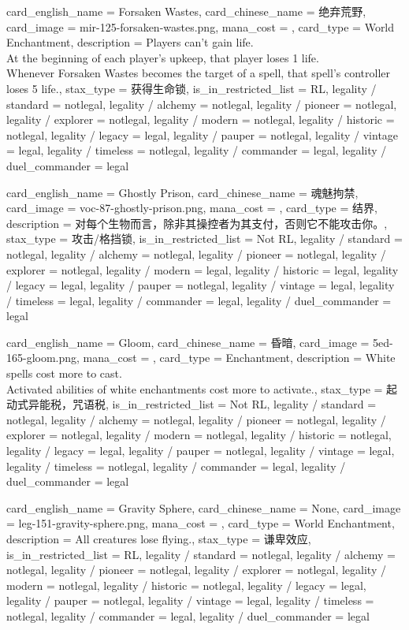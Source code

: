 \documentclass[lang = cn, color = black, 10pt]{AllThatStax}
\begin{document}
\card
{
	card_english_name = {Forsaken Wastes},
	card_chinese_name = {绝弃荒野},
	card_image = mir-125-forsaken-wastes.png,
	mana_cost = ,
	card_type = World Enchantment,
	description = {Players can't gain life.\\
		At the beginning of each player's upkeep, that player loses 1 life.\\
		Whenever Forsaken Wastes becomes the target of a spell, that spell's controller loses 5 life.},
	stax_type = 获得生命锁,
	is_in_restricted_list = RL,
	legality / standard = notlegal,
	legality / alchemy = notlegal,
	legality / pioneer = notlegal,
	legality / explorer = notlegal,
	legality / modern = notlegal,
	legality / historic = notlegal,
	legality / legacy = legal,
	legality / pauper = notlegal,
	legality / vintage = legal,
	legality / timeless = notlegal,
	legality / commander = legal,
	legality / duel_commander = legal
}

\card
{
	card_english_name = {Ghostly Prison},
	card_chinese_name = {魂魅拘禁},
	card_image = voc-87-ghostly-prison.png,
	mana_cost = ,
	card_type = 结界,
	description = {对每个生物而言，除非其操控者为其支付，否则它不能攻击你。},
	stax_type = 攻击/格挡锁,
	is_in_restricted_list = Not RL,
	legality / standard = notlegal,
	legality / alchemy = notlegal,
	legality / pioneer = notlegal,
	legality / explorer = notlegal,
	legality / modern = legal,
	legality / historic = legal,
	legality / legacy = legal,
	legality / pauper = notlegal,
	legality / vintage = legal,
	legality / timeless = legal,
	legality / commander = legal,
	legality / duel_commander = legal
}

\card
{
	card_english_name = {Gloom},
	card_chinese_name = {昏暗},
	card_image = 5ed-165-gloom.png,
	mana_cost = ,
	card_type = Enchantment,
	description = {White spells cost  more to cast.\\
		Activated abilities of white enchantments cost  more to activate.},
	stax_type = 起动式异能税，咒语税,
	is_in_restricted_list = Not RL,
	legality / standard = notlegal,
	legality / alchemy = notlegal,
	legality / pioneer = notlegal,
	legality / explorer = notlegal,
	legality / modern = notlegal,
	legality / historic = notlegal,
	legality / legacy = legal,
	legality / pauper = notlegal,
	legality / vintage = legal,
	legality / timeless = notlegal,
	legality / commander = legal,
	legality / duel_commander = legal
}

\card
{
	card_english_name = {Gravity Sphere},
	card_chinese_name = {None},
	card_image = leg-151-gravity-sphere.png,
	mana_cost = ,
	card_type = World Enchantment,
	description = {All creatures lose flying.},
	stax_type = 谦卑效应,
	is_in_restricted_list = RL,
	legality / standard = notlegal,
	legality / alchemy = notlegal,
	legality / pioneer = notlegal,
	legality / explorer = notlegal,
	legality / modern = notlegal,
	legality / historic = notlegal,
	legality / legacy = legal,
	legality / pauper = notlegal,
	legality / vintage = legal,
	legality / timeless = notlegal,
	legality / commander = legal,
	legality / duel_commander = legal
}
\end{document}
